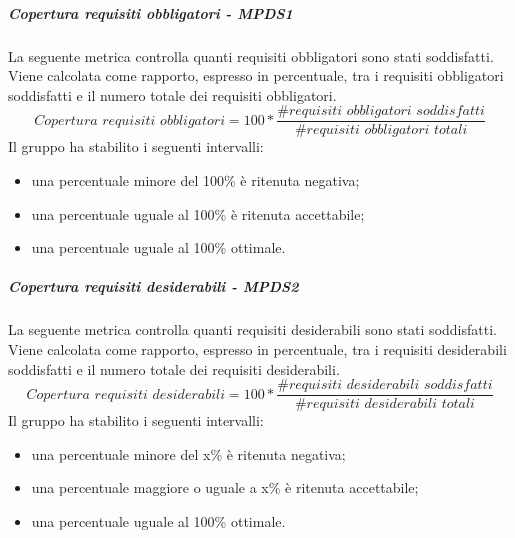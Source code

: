 \documentclass[PianoDiQualifica.tex]{subfiles}
\begin{document}
				\hypertarget{req_obbligatori}{\subparagraph{Copertura requisiti obbligatori - MPDS1}}
				La seguente metrica controlla quanti requisiti obbligatori sono stati soddisfatti. Viene calcolata come rapporto, espresso in percentuale, tra i requisiti obbligatori soddisfatti e
				il numero totale dei requisiti obbligatori. \\
				\begin{equation}\textit{Copertura requisiti obbligatori} = 100 * \frac{\textit{\#requisiti obbligatori soddisfatti}}{\textit{\#requisiti obbligatori totali}}\end{equation}
				Il gruppo ha stabilito i seguenti intervalli:
				\begin{itemize}
					\item una percentuale minore del 100\% è ritenuta negativa;
					\item una percentuale uguale al 100\% è ritenuta accettabile;
					\item una percentuale uguale al 100\% ottimale.
				\end{itemize}
				
				\hypertarget{req_desiderabili}{\subparagraph{Copertura requisiti desiderabili - MPDS2}}
				La seguente metrica controlla quanti requisiti desiderabili sono stati soddisfatti. Viene calcolata come rapporto, espresso in percentuale, tra i requisiti desiderabili soddisfatti e
				il numero totale dei requisiti desiderabili. \\
				\begin{equation}\textit{Copertura requisiti desiderabili} = 100 * \frac{\textit{\#requisiti desiderabili soddisfatti}}{\textit{\#requisiti desiderabili totali}}\end{equation}
				Il gruppo ha stabilito i seguenti intervalli:
				\begin{itemize}
					\item una percentuale minore del x\% è ritenuta negativa;
					\item una percentuale maggiore o uguale a x\% è ritenuta accettabile;
					\item una percentuale uguale al 100\% ottimale.
				\end{itemize}
				
\end{document}
